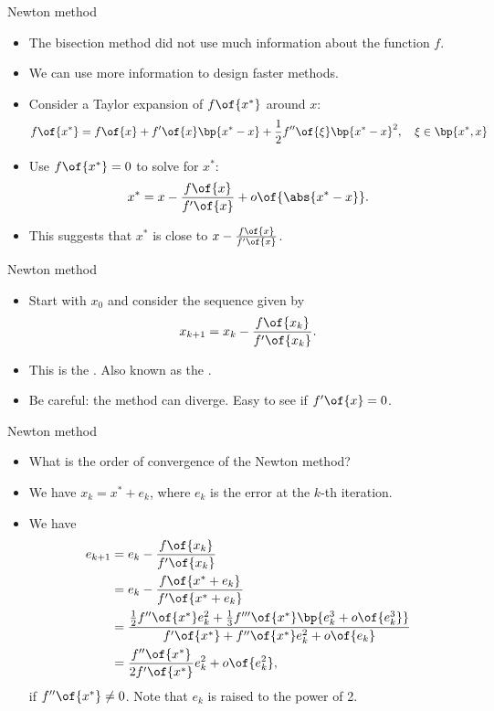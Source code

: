 \documentclass[11pt,xcolor={dvipsnames},aspectratio=159,hyperref={pdftex,pdfpagemode=UseNone,hidelinks,pdfdisplaydoctitle=true},usepdftitle=false]{beamer}
\begin{document}
\begin{frame}{Newton method}
    
    \begin{itemize}
        \item The bisection method did not use much information about the function $f$.
        \item We can use more information to design faster methods.
        \item Consider a Taylor expansion of $f\of{x^*}$ around $x$: \begin{align*}
            f\of{x^*} = f\of{x} + f'\of{x}\bp{x^*-x} + \frac{1}{2}f''\of{\xi}\bp{x^*-x}^2, \quad \xi\in\bp{x^*,x}   \end{align*}
        \item Use $f\of{x^*}=0$ to solve for $x^*$:
            \begin{align*}
                x^* = x - \frac{f\of{x}}{f'\of{x}} + o\of{\abs{x^*-x}}.
            \end{align*}
        \item This suggests that $x^*$ is close to $x - \frac{f\of{x}}{f'\of{x}}$.
\end{itemize}
\end{frame}

\begin{frame}{Newton method}
    
    \begin{itemize}
        \item Start with $x_0$ and consider the sequence given by $$x_{k+1} = x_k -\frac{f\of{x_k}}{f'\of{x_k}}.$$
        \item This is the . Also known as the .
        \item Be careful: the method can diverge. Easy to see if $f'\of{x} = 0$.
\end{itemize}
\end{frame}


\begin{frame}{Newton method}
    
    \begin{itemize}
        \item What is the order of convergence of the Newton method? 
        \item We have $x_k = x^* + e_k$, where $e_k$ is the error at the $k$-th iteration.
        \item We have \begin{align*}
            e_{k+1} &= e_k - \frac{f\of{x_k}}{f'\of{x_k}} \\
            &= e_k - \frac{f\of{x^* + e_k}}{f'\of{x^* + e_k}} \\
            &= \frac{\frac{1}{2}f''\of{x^*}e_k^2 + \frac{1}{3}f'''\of{x^*}\bp{e_k^3 + o\of{e_k^3}}}{f'\of{x^*} + f''\of{x^*}e_k^2 + o\of{e_k}} \\
            &= \frac{f''\of{x^*}}{2f'\of{x^*}}e_k^2 + o\of{e_k^2}, 
        \end{align*}
        if $f''\of{x^*} \neq 0$. Note that $e_k$ is raised to the power of 2.
\end{itemize}
\end{frame}
\end{document}

